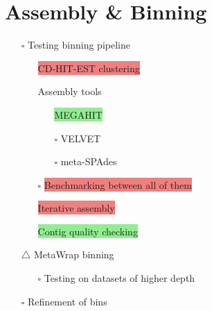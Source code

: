 \documentclass[11pt]{article}
\newcommand{\done}{\checkmark}  %
\newcommand{\pending}{$\square$}  %
\newcommand{\issue}{$\triangle$}  %
\newcommand{\draft}{\faPencil}
\newcommand{\highlightessential}[1]{\colorbox{lightgreen}{#1}}  %
\newcommand{\highlightoptional}[1]{\colorbox{lightorange}{#1}}  %
\newcommand{\highlightrobust}[1]{\colorbox{lightcoral}{#1}}  %
\begin{document}
\section{Assembly \& Binning}
\begin{itemize}
	\item [\pending] Testing binning pipeline
	\begin{itemize}
		\item [\done] \highlightrobust{CD-HIT-EST clustering}
		\item [\done] Assembly tools
		\begin{itemize}
			\item [\done] \highlightessential{MEGAHIT}
			\item [\pending] \highlightoptional{VELVET}
			\item [\pending] \highlightoptional{meta-SPAdes}
		\end{itemize}
		\item [\pending] \highlightrobust{Benchmarking between all of them}
		\item [\draft] \highlightrobust{Iterative assembly}
		\item [\draft] \highlightessential{Contig quality checking}
	\end{itemize}
	\item [\issue] MetaWrap binning
	\begin{itemize}
		\item [\pending] Testing on datasets of higher depth
	\end{itemize}
	\item [\pending] Refinement of bins
\end{itemize}


	
\end{document}
